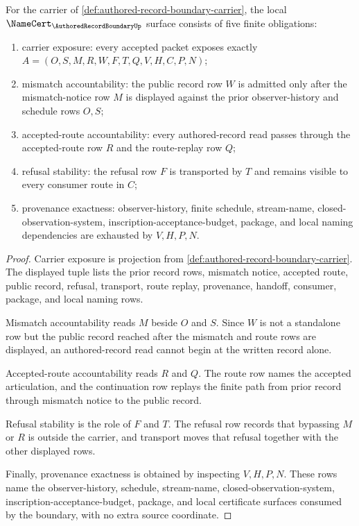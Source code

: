 \begin{theorem}
\label{thm:authored-record-boundary-namecert-obligations}
For the carrier of \autoref{def:authored-record-boundary-carrier}, the local $\NameCert_{\AuthoredRecordBoundaryUp}$ surface consists of five finite obligations:
\begin{enumerate}
\item carrier exposure: every accepted packet exposes exactly $A=(O,S,M,R,W,F,T,Q,V,H,C,P,N)$;
\item mismatch accountability: the public record row $W$ is admitted only after the mismatch-notice row $M$ is displayed against the prior observer-history and schedule rows $O,S$;
\item accepted-route accountability: every authored-record read passes through the accepted-route row $R$ and the route-replay row $Q$;
\item refusal stability: the refusal row $F$ is transported by $T$ and remains visible to every consumer route in $C$;
\item provenance exactness: observer-history, finite schedule, stream-name, closed-observation-system, inscription-acceptance-budget, package, and local naming dependencies are exhausted by $V,H,P,N$.
\end{enumerate}
\end{theorem}
\begin{proof}
Carrier exposure is projection from \autoref{def:authored-record-boundary-carrier}. The displayed tuple lists the prior record rows, mismatch notice, accepted route, public record, refusal, transport, route replay, provenance, handoff, consumer, package, and local naming rows.

Mismatch accountability reads $M$ beside $O$ and $S$. Since $W$ is not a standalone row but the public record reached after the mismatch and route rows are displayed, an authored-record read cannot begin at the written record alone.

Accepted-route accountability reads $R$ and $Q$. The route row names the accepted articulation, and the continuation row replays the finite path from prior record through mismatch notice to the public record.

Refusal stability is the role of $F$ and $T$. The refusal row records that bypassing $M$ or $R$ is outside the carrier, and transport moves that refusal together with the other displayed rows.

Finally, provenance exactness is obtained by inspecting $V,H,P,N$. These rows name the observer-history, schedule, stream-name, closed-observation-system, inscription-acceptance-budget, package, and local certificate surfaces consumed by the boundary, with no extra source coordinate.
\end{proof}


